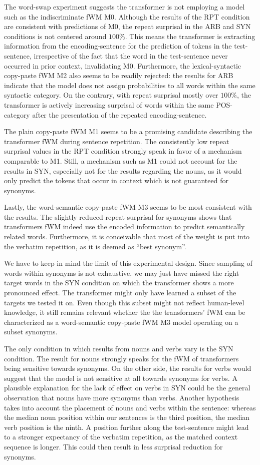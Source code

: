 The word-swap experiment suggests the transformer is not employing a model such as the indiscriminate fWM M0. Although the results of the RPT condition are consistent with predictions of M0, the repeat surprisal in the ARB and SYN conditions is not centered around $100\%$.
This means the transformer is extracting information from the encoding-sentence for the prediction of tokens in the test-sentence, irrespective of the fact that the word in the test-sentence never occurred in prior context, invalidating M0.
Furthermore, the lexical-syntactic copy-paste fWM M2 also seems to be readily rejected: the results for ARB indicate that the model does not assign probabilities to all words within the same syntactic category.
On the contrary, with repeat surprisal mostly over $100\%$, the transformer is actively increasing surprisal of words within the same POS-category after the presentation of the repeated encoding-sentence.

The plain copy-paste fWM M1 seems to be a promising candidate describing the transformer fWM during sentence repetition.
The consistently low repeat surprisal values in the RPT condition strongly speak in favor of a mechanism comparable to M1.
Still, a mechanism such as M1 could not account for the results in SYN, especially not for the results regarding the nouns, as it would only predict the tokens that occur in context which is not guaranteed for synonyms.

Lastly, the word-semantic copy-paste fWM M3 seems to be most consistent with the results. The slightly reduced repeat surprisal for synonyms shows that transformers fWM indeed use the encoded information to predict semantically related words. Furthermore, it is conceivable that most of the weight is put into the verbatim repetition, as it is deemed as ``best synonym''.

We have to keep in mind the limit of this experimental design.
Since sampling of words within synonyms is not exhaustive, we may just have missed the right target words in the SYN condition on which the transformer shows a more pronounced effect.
The transformer might only have learned a subset of the targets we tested it on.
Even though this subset might not reflect human-level knowledge, it still remains relevant whether the the transformers' fWM can be characterized as a word-semantic copy-paste fWM M3 model operating on a subset synonyms.

The only condition in which results from nouns and verbs vary is the SYN condition. The result for nouns strongly speaks for the fWM of transformers being sensitive towards synonyms. On the other side, the results for verbs would suggest that the model is not sensitive at all towards synonyms for verbs. A plausible explanation for the lack of effect on verbs in SYN could be the general observation that nouns have more synonyms than verbs. Another hypothesis takes into account the placement of nouns and verbs within the sentence: whereas the median noun position within our sentences is the third position, the median verb position is the ninth. A position further along the test-sentence might lead to a stronger expectancy of the verbatim repetition, as the matched context sequence is longer. This could then result in less surprisal reduction for synonyms.

